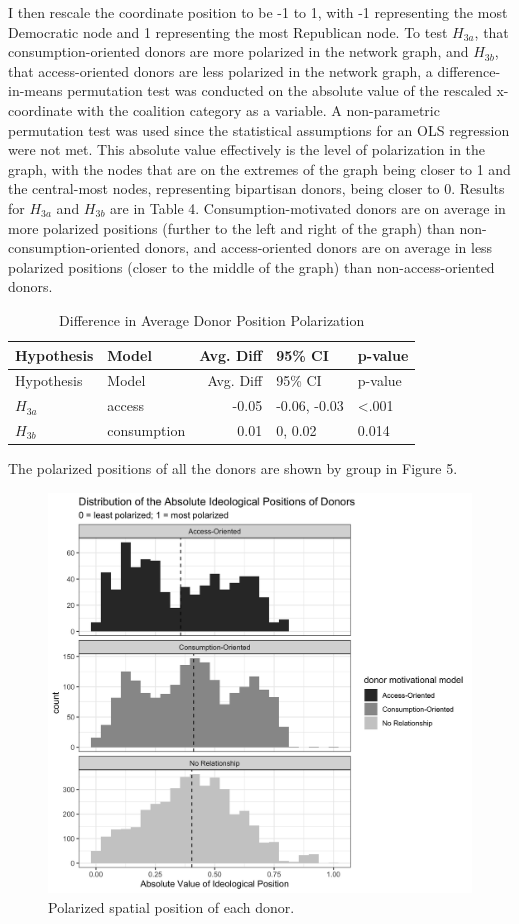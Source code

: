 \documentclass[12pt,]{article}
\begin{document}
I then rescale the coordinate position to be -1 to 1, with -1
representing the most Democratic node and 1 representing the most
Republican node. To test \(H_{3a}\), that consumption-oriented donors
are more polarized in the network graph, and \(H_{3b}\), that
access-oriented donors are less polarized in the network graph, a
difference-in-means permutation test was conducted on the absolute value
of the rescaled x-coordinate with the coalition category as a variable.
A non-parametric permutation test was used since the statistical
assumptions for an OLS regression were not met. This absolute value
effectively is the level of polarization in the graph, with the nodes
that are on the extremes of the graph being closer to 1 and the
central-most nodes, representing bipartisan donors, being closer to 0.
Results for \(H_{3a}\) and \(H_{3b}\) are in Table 4.
Consumption-motivated donors are on average in more polarized positions
(further to the left and right of the graph) than
non-consumption-oriented donors, and access-oriented donors are on
average in less polarized positions (closer to the middle of the graph)
than non-access-oriented donors.

\begin{longtable}[]{@{}llrll@{}}
\caption{Difference in Average Donor Position
Polarization}\tabularnewline
\toprule
Hypothesis & Model & Avg. Diff & 95\% CI & p-value\tabularnewline
\midrule
\endfirsthead
\toprule
Hypothesis & Model & Avg. Diff & 95\% CI & p-value\tabularnewline
\midrule
\endhead
\(H_{3a}\) & access & -0.05 & -0.06, -0.03 &
\textless.001\tabularnewline
\(H_{3b}\) & consumption & 0.01 & 0, 0.02 & 0.014\tabularnewline
\bottomrule
\end{longtable}

The polarized positions of all the donors are shown by group in Figure
5.

\begin{figure}
\centering
\includegraphics{../tables_and_figures/fig_node_position_absolute.jpg}
\caption{Polarized spatial position of each donor.}
\end{figure}
\end{document}
